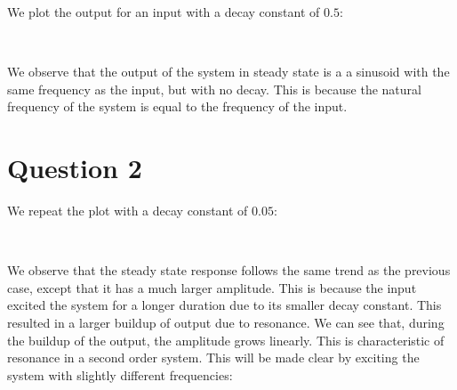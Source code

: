 \documentclass[11pt]{article}
\begin{document}
	

	

	
		


	

	

	
		
    We plot the output for an input with a decay constant of \(0.5\):

	

	

    \begin{center}
    \end{center}
    { \hspace*{\fill} \\}
    
	
		
    We observe that the output of the system in steady state is a a sinusoid
with the same frequency as the input, but with no decay. This is because
the natural frequency of the system is equal to the frequency of the
input.

	

	
		
    \section{Question 2}\label{question-2}

We repeat the plot with a decay constant of \(0.05\):

	

	

    \begin{center}
    \end{center}
    { \hspace*{\fill} \\}
    
	
		
    We observe that the steady state response follows the same trend as the
previous case, except that it has a much larger amplitude. This is
because the input excited the system for a longer duration due to its
smaller decay constant. This resulted in a larger buildup of output due
to resonance. We can see that, during the buildup of the output, the
amplitude grows linearly. This is characteristic of resonance in a
second order system. This will be made clear by exciting the system with
slightly different frequencies:
\end{document}
